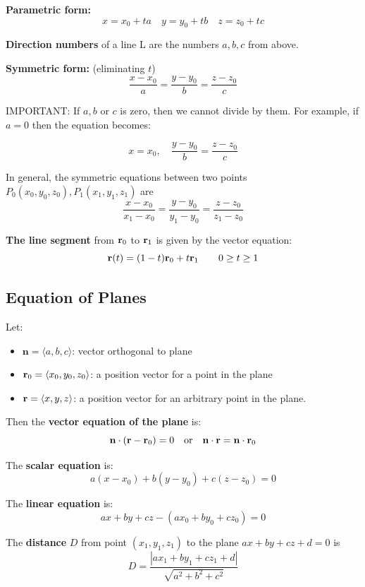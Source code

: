 \documentclass{report}
\begin{document}
\textbf{Parametric form:}
\[
x = x_0 + t a \quad y = y_0 + t b \quad z = z_0 + t c
\]

\textbf{Direction numbers} of a line L are the numbers $a, b, c$ from above. 

\textbf{Symmetric form:} (eliminating $t$) 
\[
\frac{x - x_0}{a} = \frac{y - y_0}{b} = \frac{z - z_0}{c}
\]

IMPORTANT: If $a, b$ or $c$ is zero, then we cannot divide by them.
For example, if $a = 0$ then the equation becomes:

\[
x = x_0, \quad \frac{y - y_0}{b} = \frac{z - z_0}{c}
\]

In general, the symmetric equations between two points $P_0(x_0, y_0, z_0), P_1(x_1, y_1, z_1)$ are 
\[
\frac{x - x_0}{x_1 - x_0} = \frac{y - y_0}{y_1 - y_0} = \frac{z - z_0}{z_1 - z_0}
\]

\textbf{The line segment} from $\mathbf{r}_0$ to $\mathbf{r}_1$ is given by the vector equation:
\[
\mathbf{r}(t) = (1 - t)\mathbf{r}_0 + t \mathbf{r}_1 \quad \quad 0 \ge t \ge 1
\]

\subsection{Equation of Planes}

Let: 
\begin{itemize}
    \item $\mathbf{n} = \langle a, b, c \rangle$: vector orthogonal to plane
    \item $\mathbf{r}_0 = \langle x_0, y_0, z_0 \rangle$: a position vector for a point in the plane 
    \item $\mathbf{r} = \langle x, y, z \rangle$: a position vector for an arbitrary point in the plane.
\end{itemize}

Then the \textbf{vector equation of the plane} is: 
\[
\mathbf{n} \cdot (\mathbf{r} - \mathbf{r}_0) = 0 \quad \text{or} \quad \mathbf{n} \cdot \mathbf{r} = \mathbf{n} \cdot \mathbf{r}_0
\]

The \textbf{scalar equation} is:
\[
a(x - x_0) + b(y - y_0) + c(z - z_0) = 0
\]

The \textbf{linear equation} is:
\[
ax + by + cz - (a x_0 + b y_0 + c z_0) = 0
\] 

The \textbf{distance} $D$ from point $(x_1, y_1, z_1)$ to the plane 
$ax + by + cz + d = 0$ is 
\[
D = \frac{|a x_1 + b y_1 + c z_1 + d|}{\sqrt{a^2 + b^2 + c^2}}
\]
\end{document}
